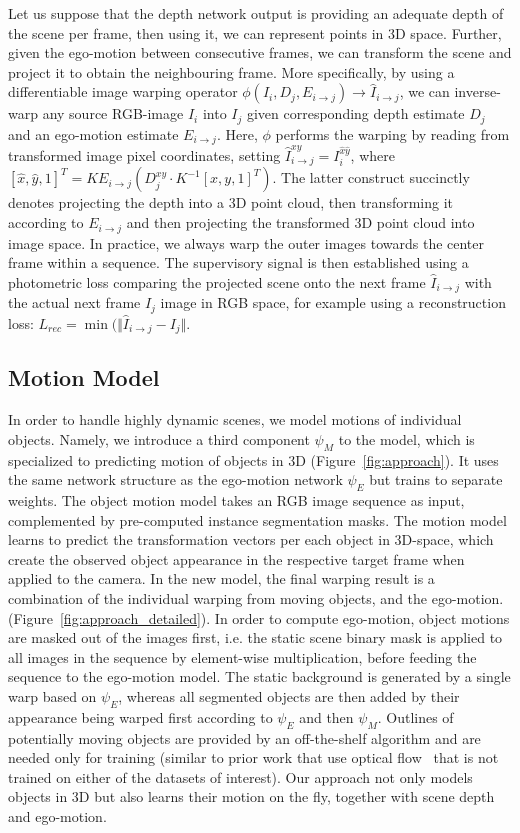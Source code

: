 \documentclass[10pt,twocolumn,letterpaper]{article}
\begin{document}
Let us suppose that the depth network output is providing an adequate depth of the scene per frame, then using it, we can represent points in 3D space. Further, given the ego-motion between consecutive frames, we can transform the scene and project it to obtain the neighbouring frame.
More specifically, by using a differentiable image warping operator $\phi(I_i, D_j, E_{i\rightarrow j})\rightarrow \hat{I}_{i\rightarrow j}$, we can inverse-warp any source RGB-image $I_i$ into $I_j$ given corresponding depth estimate $D_j$ and an ego-motion estimate $E_{i\rightarrow j}$. Here, $\phi$ performs the warping by reading from transformed image pixel coordinates, setting $\hat{I}_{i\rightarrow j}^{xy} = I_i^{\hat{x}\hat{y}}$, where $[\hat{x},\hat{y},1]^T=KE_{i\rightarrow j} (D_j^{xy} \cdot K^{-1} [x,y,1]^T)$.
The latter construct succinctly denotes projecting the depth into a 3D point cloud, then transforming it according to $E_{i\rightarrow j}$ and then projecting the transformed 3D point cloud into image space.
In practice, we always warp the outer images towards the center frame within a sequence.
The supervisory signal is then established using a photometric loss comparing the projected scene onto the next frame $\hat{I}_{i\rightarrow j}$ with the actual next frame $I_j$ image in RGB space, for example using a reconstruction loss: $L_{rec}=\min(\Vert \hat{I}_{i\rightarrow j}-I_j\Vert$.

\subsection{Motion Model}
In order to handle highly dynamic scenes, we model motions of individual objects.
Namely, we introduce a third component $\psi_M$ to the model, which is specialized to predicting motion of objects in 3D (Figure~\ref{fig:approach}).
It uses the same network structure as the ego-motion network $\psi_E$ but trains to separate weights. The object motion model takes an RGB image sequence as input, complemented by pre-computed instance segmentation masks. The motion model learns to predict the transformation vectors per each object in 3D-space, which create the observed object appearance in the respective target frame when applied to the camera. In the new model, the final warping result is a combination of the individual warping from moving objects, and the ego-motion. (Figure~\ref{fig:approach_detailed}).
In order to compute ego-motion, object motions are masked out of the images first, i.e. the static scene binary mask is applied to all images in the sequence by element-wise multiplication, before feeding the sequence to the ego-motion model.
The static background is generated by a single warp based on $\psi_E$, whereas all segmented objects are then added by their appearance being warped first according to $\psi_E$ and then $\psi_M$. Outlines of potentially moving objects are provided by an off-the-shelf algorithm \cite{he2017mask} and are needed only for training (similar to prior work that use optical flow~\cite{yang2018every} that is not trained on either of the datasets of interest). Our approach not only models objects in 3D but also learns their motion on the fly, together with scene depth and ego-motion.
\end{document}
